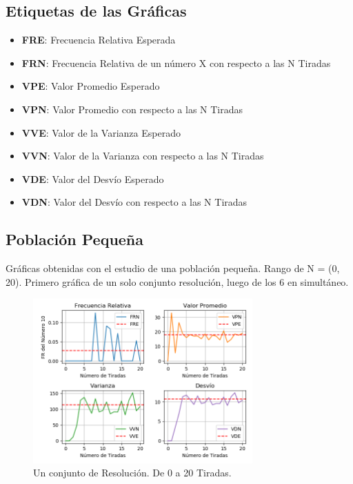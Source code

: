 \documentclass[a4paper]{article}
\begin{document}
\subsection{Etiquetas de las Gráficas}
\label{sec:etiquetas}

\begin{itemize}
    \item \textbf{FRE}: Frecuencia Relativa Esperada
    \item \textbf{FRN}: Frecuencia Relativa de un número X con respecto a las N Tiradas
    \item \textbf{VPE}: Valor Promedio Esperado
    \item \textbf{VPN}: Valor Promedio con respecto a las N Tiradas
    \item \textbf{VVE}: Valor de la Varianza Esperado
    \item \textbf{VVN}: Valor de la Varianza con respecto a las N Tiradas
    \item \textbf{VDE}: Valor del Desvío Esperado
    \item \textbf{VDN}: Valor del Desvío con respecto a las N Tiradas
\end{itemize}

\subsection{Población Pequeña}
\label{sec:pobpeq}

Gráficas obtenidas con el estudio de una población pequeña. Rango de N = (0, 20). Primero gráfica de un solo conjunto resolución, luego de los 6 en simultáneo.

\begin{figure}[H]
    \centering
    \includegraphics[width=0.75\textwidth]{./graphs/graph_iterations_20.png}
    \caption{\label{fig:img1}Un conjunto de Resolución. De 0 a 20 Tiradas.}
\end{figure}
\end{document}
